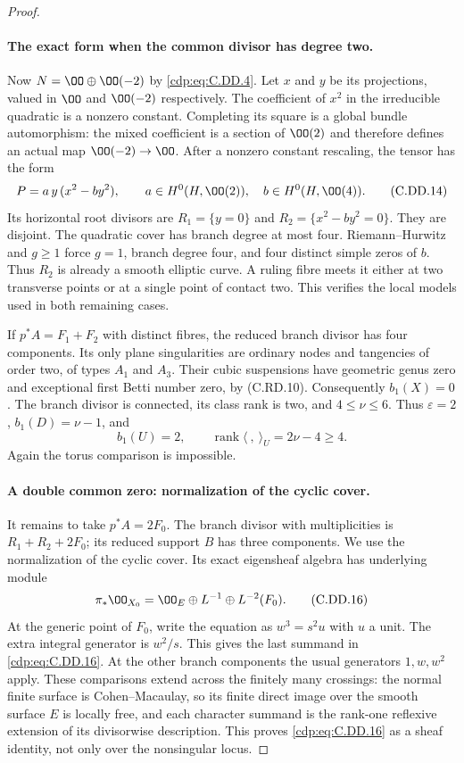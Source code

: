 \begin{proof}
\paragraph{The exact form when the common divisor has degree two.}
Now $N=\OO\oplus\OO(-2)$ by \eqref{cdp:eq:C.DD.4}.
Let $x$ and $y$ be its projections, valued in
$\OO$ and $\OO(-2)$ respectively. The coefficient
of $x^2$ in the irreducible quadratic is a nonzero
constant. Completing its square is a global bundle
automorphism: the mixed coefficient is a section
of $\OO(2)$ and therefore defines an actual map
$\OO(-2)\to\OO$. After a nonzero constant rescaling,
the tensor has the form
\[
 P=a\,y\,(x^2-b y^2),\qquad
 a\in H^0(H,\OO(2)),\quad b\in H^0(H,\OO(4)).
\tag{C.DD.14}\label{cdp:eq:C.DD.14}
\]
Its horizontal root divisors are
$R_1=\{y=0\}$ and $R_2=\{x^2-b y^2=0\}$.
They are disjoint. The quadratic cover has branch
degree at most four. Riemann--Hurwitz and $g\ge1$
force $g=1$, branch degree four, and four distinct
simple zeros of $b$. Thus $R_2$ is already a smooth
elliptic curve. A ruling fibre meets it either at
two transverse points or at a single point of
contact two. This verifies the local models used
in both remaining cases.

If $p^*A=F_1+F_2$ with distinct fibres, the reduced
branch divisor has four components. Its only plane
singularities are ordinary nodes and tangencies of
order two, of types $A_1$ and $A_3$.
Their cubic suspensions have geometric genus zero
and exceptional first Betti number zero, by
(C.RD.10). Consequently $b_1(X)=0$.
The branch divisor is connected, its class rank
is two, and $4\le\nu\le6$.
Thus $\varepsilon=2$, $b_1(D)=\nu-1$, and
\[
 b_1(U)=2,\qquad
 \operatorname{rank}\langle\ ,\ \rangle_U
                       =2\nu-4\ge4.
\tag{C.DD.15}\label{cdp:eq:C.DD.15}
\]
Again the torus comparison is impossible.

\paragraph{A double common zero: normalization of the cyclic cover.}
It remains to take $p^*A=2F_0$. The branch divisor
with multiplicities is $R_1+R_2+2F_0$; its reduced
support $B$ has three components. We use the
normalization of the cyclic cover. Its exact
eigensheaf algebra has underlying module
\[
       \pi_*\OO_{X_0}
       =\OO_E\oplus L^{-1}\oplus L^{-2}(F_0).
\tag{C.DD.16}\label{cdp:eq:C.DD.16}
\]
At the generic point of $F_0$, write the equation
as $w^3=s^2u$ with $u$ a unit. The extra integral
generator is $w^2/s$. This gives the last summand
in \eqref{cdp:eq:C.DD.16}. At the other branch components the
usual generators $1,w,w^2$ apply. These comparisons
extend across the finitely many crossings: the
normal finite surface is Cohen--Macaulay, so its
finite direct image over the smooth surface $E$
is locally free, and each character summand is
the rank-one reflexive extension of its divisorwise
description. This proves \eqref{cdp:eq:C.DD.16} as a sheaf
identity, not only over the nonsingular locus.


\end{proof}
